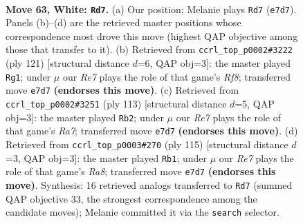 \documentclass[11pt]{article}
\begin{document}
\clearpage

\begin{figure}[p]\centering
\begin{subfigure}{0.46\textwidth}\centering
\resizebox{\linewidth}{!}{%
\newchessgame
\chessboard[
  setfen={5rk1/4R3/P7/8/8/6K1/8/8 w - - 11 63},
  showmover=false,
  pgfstyle=straightmove, color=movearrow, markmove={e7-d7}
]}
\caption{}
\end{subfigure}\hfill
\begin{subfigure}{0.46\textwidth}\centering
\resizebox{\linewidth}{!}{%
\newchessgame
\chessboard[
  setfen={4K3/4R1P1/8/8/1p1k4/8/8/5r2 b - - 20 61},
  showmover=false,
  pgfstyle=straightmove, color=movearrow, markmove={f1-g1}
]}
\caption{}
\end{subfigure}
\\[4pt]
\begin{subfigure}{0.46\textwidth}\centering
\resizebox{\linewidth}{!}{%
\newchessgame
\chessboard[
  setfen={8/8/8/5k1p/7P/8/r7/6RK b - - 4 57},
  showmover=false,
  pgfstyle=straightmove, color=movearrow, markmove={a2-b2}
]}
\caption{}
\end{subfigure}\hfill
\begin{subfigure}{0.46\textwidth}\centering
\resizebox{\linewidth}{!}{%
\newchessgame
\chessboard[
  setfen={8/1KR5/8/1P1k4/8/8/8/r7 b - - 12 58},
  showmover=false,
  pgfstyle=straightmove, color=movearrow, markmove={a1-b1}
]}
\caption{}
\end{subfigure}
\caption{\textbf{Move 63, White: \texttt{Rd7}.} (a) Our position; Melanie plays \texttt{Rd7} (\texttt{e7d7}). Panels (b)--(d) are the retrieved master positions whose correspondence most drove this move (highest QAP objective among those that transfer to it). (b) Retrieved from \texttt{ccrl\_top\_p0002\#3222} (ply 121) [structural distance $d$=6, QAP obj=3]: the master played \texttt{Rg1}; under $\mu$ our \emph{Re7} plays the role of that game's \emph{Rf8}; transferred move \texttt{e7d7} \textbf{(endorses this move)}. (c) Retrieved from \texttt{ccrl\_top\_p0002\#3251} (ply 113) [structural distance $d$=5, QAP obj=3]: the master played \texttt{Rb2}; under $\mu$ our \emph{Re7} plays the role of that game's \emph{Ra7}; transferred move \texttt{e7d7} \textbf{(endorses this move)}. (d) Retrieved from \texttt{ccrl\_top\_p0003\#270} (ply 115) [structural distance $d$=3, QAP obj=3]: the master played \texttt{Rb1}; under $\mu$ our \emph{Re7} plays the role of that game's \emph{Ra8}; transferred move \texttt{e7d7} \textbf{(endorses this move)}. Synthesis: 16 retrieved analogs transferred to \texttt{Rd7} (summed QAP objective 33, the strongest correspondence among the candidate moves); Melanie committed it via the \texttt{search} selector.}
\label{fig:thought-m124}
\end{figure}
\end{document}
